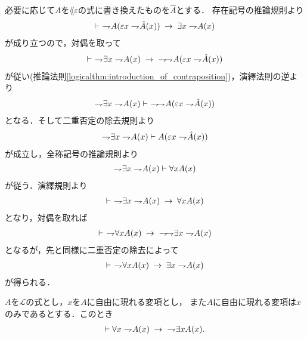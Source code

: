 	\begin{sketch}
		必要に応じて$A$を$\lang{\varepsilon}$の式に書き換えたものを$\hat{A}$とする．
		存在記号の推論規則より
		\begin{align}
			\vdash\ \rightharpoondown\hspace{-0.25em} A(\varepsilon x \rightharpoondown\hspace{-0.25em} \hat{A}(x)) \hspace{0.25em}\rightarrow\hspace{0.25em} \exists x \rightharpoondown\hspace{-0.25em} A(x)
		\end{align}
		が成り立つので，対偶を取って
		\begin{align}
			\vdash\ \negation \exists x \negation A(x) \rarrow\ \negation\negation A(\varepsilon x \negation \hat{A}(x))
		\end{align}
		が従い(推論法則\ref{logicalthm:introduction_of_contraposition})，演繹法則の逆より
		\begin{align}
			\negation \exists x \negation A(x) \vdash\ \negation\negation A(\varepsilon x \negation \hat{A}(x))
		\end{align}
		となる．そして二重否定の除去規則より
		\begin{align}
			\rightharpoondown\hspace{-0.25em} \exists x \rightharpoondown\hspace{-0.25em} A(x) \vdash A(\varepsilon x \rightharpoondown\hspace{-0.25em} \hat{A}(x))
		\end{align}
		が成立し，全称記号の推論規則より
		\begin{align}
			\rightharpoondown\hspace{-0.25em} \exists x \rightharpoondown\hspace{-0.25em} A(x) \vdash \forall x A(x)
		\end{align}
		が従う．演繹規則より
		\begin{align}
			\vdash\ \rightharpoondown\hspace{-0.25em} \exists x \rightharpoondown\hspace{-0.25em} A(x) \hspace{0.25em}\rightarrow\hspace{0.25em} \forall x A(x)
		\end{align}
		となり，対偶を取れば
		\begin{align}
			\vdash\ \rightharpoondown\hspace{-0.25em} \forall x A(x) \hspace{0.25em}\rightarrow\hspace{0.25em}\ \rightharpoondown\hspace{-0.25em}\rightharpoondown\hspace{-0.25em} \exists x \rightharpoondown\hspace{-0.25em} A(x)
		\end{align}
		となるが，先と同様に二重否定の除去によって
		\begin{align}
			\vdash\ \rightharpoondown\hspace{-0.25em} \forall x A(x) \hspace{0.25em}\rightarrow\hspace{0.25em} \exists x \rightharpoondown\hspace{-0.25em} A(x)
		\end{align}
		が得られる．
		\QED
	\end{sketch}
	
	\begin{screen}
		\begin{logicalthm}
		\label{logicalthm:strong_De_Morgan_law_for_quantifiers_1}
			$A$を$\mathcal{L}$の式とし，$x$を$A$に自由に現れる変項とし，
			また$A$に自由に現れる変項は$x$のみであるとする．このとき
			\begin{align}
				\vdash \forall x \rightharpoondown\hspace{-0.25em} A(x) \hspace{0.25em}\rightarrow\hspace{0.25em}\ \rightharpoondown\hspace{-0.25em} \exists x A(x).
			\end{align}
		\end{logicalthm}
	\end{screen}
	
